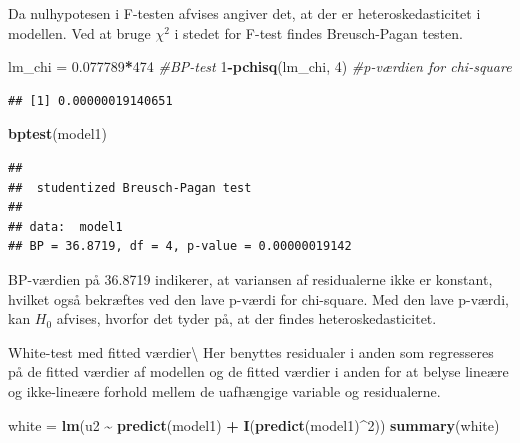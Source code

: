 \documentclass[
]{article}
\newenvironment{Shaded}{\begin{snugshade}}{\end{snugshade}}
\newcommand{\CommentTok}[1]{\textcolor[rgb]{0.56,0.35,0.01}{\textit{#1}}}
\newcommand{\DecValTok}[1]{\textcolor[rgb]{0.00,0.00,0.81}{#1}}
\newcommand{\FloatTok}[1]{\textcolor[rgb]{0.00,0.00,0.81}{#1}}
\newcommand{\FunctionTok}[1]{\textcolor[rgb]{0.13,0.29,0.53}{\textbf{#1}}}
\newcommand{\NormalTok}[1]{#1}
\newcommand{\OtherTok}[1]{\textcolor[rgb]{0.56,0.35,0.01}{#1}}
\newcommand{\SpecialCharTok}[1]{\textcolor[rgb]{0.81,0.36,0.00}{\textbf{#1}}}
\begin{document}
Da nulhypotesen i F-testen afvises angiver det, at der er
heteroskedasticitet i modellen. Ved at bruge \(\chi^2\) i stedet for
F-test findes Breusch-Pagan testen.

\begin{Shaded}
\begin{Highlighting}[]
\NormalTok{lm\_chi }\OtherTok{=} \FloatTok{0.077789}\SpecialCharTok{*}\DecValTok{474} \CommentTok{\#BP{-}test}
\DecValTok{1}\SpecialCharTok{{-}}\FunctionTok{pchisq}\NormalTok{(lm\_chi, }\DecValTok{4}\NormalTok{) }\CommentTok{\#p{-}værdien for chi{-}square}
\end{Highlighting}
\end{Shaded}

\begin{verbatim}
## [1] 0.00000019140651
\end{verbatim}

\begin{Shaded}
\begin{Highlighting}[]
\FunctionTok{bptest}\NormalTok{(model1)}
\end{Highlighting}
\end{Shaded}

\begin{verbatim}
## 
##  studentized Breusch-Pagan test
## 
## data:  model1
## BP = 36.8719, df = 4, p-value = 0.00000019142
\end{verbatim}

BP-værdien på 36.8719 indikerer, at variansen af residualerne ikke er
konstant, hvilket også bekræftes ved den lave p-værdi for chi-square.
Med den lave p-værdi, kan \(H_0\) afvises, hvorfor det tyder på, at der
findes heteroskedasticitet.

White-test med fitted værdier\textbackslash{} Her benyttes residualer i
anden som regresseres på de fitted værdier af modellen og de fitted
værdier i anden for at belyse lineære og ikke-lineære forhold mellem de
uafhængige variable og residualerne.

\begin{Shaded}
\begin{Highlighting}[]
\NormalTok{white }\OtherTok{=} \FunctionTok{lm}\NormalTok{(u2 }\SpecialCharTok{\textasciitilde{}} \FunctionTok{predict}\NormalTok{(model1) }\SpecialCharTok{+} \FunctionTok{I}\NormalTok{(}\FunctionTok{predict}\NormalTok{(model1)}\SpecialCharTok{\^{}}\DecValTok{2}\NormalTok{))}
\FunctionTok{summary}\NormalTok{(white)}
\end{Highlighting}
\end{Shaded}
\end{document}

